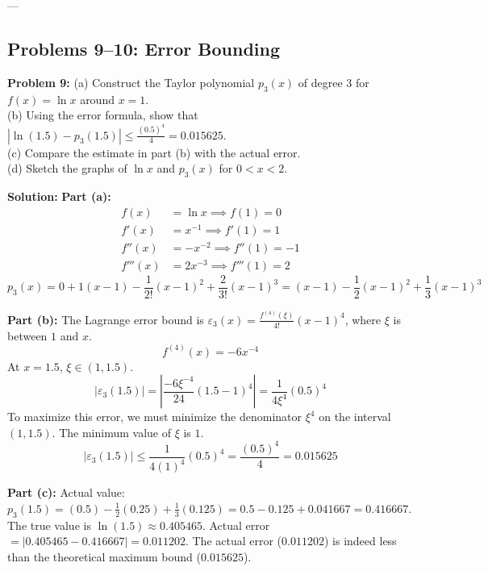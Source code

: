 \documentclass[11pt, letterpaper]{article}
\theoremstyle{definition}
\theoremstyle{remark}
\begin{document}
---

\subsection{Problems 9--10: Error Bounding}

\textbf{Problem 9:} 
(a) Construct the Taylor polynomial $p_3(x)$ of degree 3 for $f(x) = \ln x$ around $x = 1$. \\
(b) Using the error formula, show that $|\ln(1.5) - p_3(1.5)| \le \frac{(0.5)^4}{4} = 0.015625$. \\
(c) Compare the estimate in part (b) with the actual error. \\
(d) Sketch the graphs of $\ln x$ and $p_3(x)$ for $0 < x < 2$.

\textbf{Solution:}
\textbf{Part (a):}
\begin{align*}
    f(x) &= \ln x \implies f(1) = 0 \\
    f'(x) &= x^{-1} \implies f'(1) = 1 \\
    f''(x) &= -x^{-2} \implies f''(1) = -1 \\
    f'''(x) &= 2x^{-3} \implies f'''(1) = 2
\end{align*}
\[ p_3(x) = 0 + 1(x-1) - \frac{1}{2!}(x-1)^2 + \frac{2}{3!}(x-1)^3 = (x-1) - \frac{1}{2}(x-1)^2 + \frac{1}{3}(x-1)^3 \]

\textbf{Part (b):}
The Lagrange error bound is $\varepsilon_3(x) = \frac{f^{(4)}(\xi)}{4!}(x-1)^4$, where $\xi$ is between $1$ and $x$.
\[ f^{(4)}(x) = -6x^{-4} \]
At $x = 1.5$, $\xi \in (1, 1.5)$.
\[ |\varepsilon_3(1.5)| = \left| \frac{-6\xi^{-4}}{24} (1.5 - 1)^4 \right| = \frac{1}{4\xi^4} (0.5)^4 \]
To maximize this error, we must minimize the denominator $\xi^4$ on the interval $(1, 1.5)$. The minimum value of $\xi$ is $1$.
\[ |\varepsilon_3(1.5)| \le \frac{1}{4(1)^4} (0.5)^4 = \frac{(0.5)^4}{4} = 0.015625 \]

\textbf{Part (c):}
Actual value: $p_3(1.5) = (0.5) - \frac{1}{2}(0.25) + \frac{1}{3}(0.125) = 0.5 - 0.125 + 0.041667 = 0.416667$.
The true value is $\ln(1.5) \approx 0.405465$.
Actual error $= |0.405465 - 0.416667| = 0.011202$.
The actual error ($0.011202$) is indeed less than the theoretical maximum bound ($0.015625$).
\end{document}
